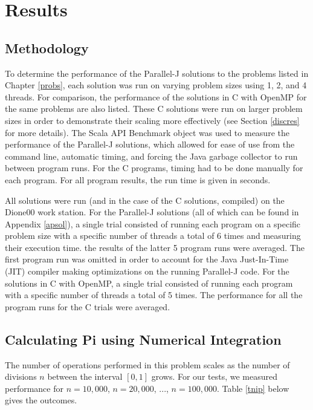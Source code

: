 \chapter{Results}
\label{res}

\section{Methodology}
To determine the performance of the Parallel-J solutions to the problems listed in Chapter \ref{probs}, 
each solution was run on varying problem sizes using 1, 2, and 4 threads. 
For comparison, the performance of the solutions in 
C with OpenMP for the same problems are also listed. 
These C solutions were run on larger problem sizes 
in order to demonstrate their scaling more effectively 
(see Section \ref{discres} for more details).
The Scala API Benchmark object was used to measure the performance of the Parallel-J solutions, 
which allowed for ease of use from the command line, automatic timing, 
and forcing the Java garbage collector to run between program runs. 
For the C programs, timing had to be done manually for each program. 
For all program results, the run time is given in seconds.

All solutions were run (and in the case of the C solutions, compiled) on the Dione00 work station. %
For the Parallel-J solutions (all of which can be found in Appendix \ref{apsol}), 
a single trial consisted of running each program 
on a specific problem size with a specific number of threads 
a total of 6 times and measuring their execution time. 
the results of the latter 5 program runs were averaged. 
The first program run was omitted in order to account for 
the Java Just-In-Time (JIT) compiler making optimizations on the running Parallel-J code.
For the solutions in C with OpenMP,
a single trial consisted of running each program with a specific number of threads a total of 5 times. 
The performance for all the program runs for the C trials were averaged.

\section{Calculating Pi using Numerical Integration}
\label{respi}
The number of operations performed in this problem scales 
as the number of divisions $n$ between the interval $[0,1]$ grows. 
For our tests, we measured performance for $n=10,000$, $n=20,000$, ..., $n=100,000$.
Table \ref{tnip} below gives the outcomes.

